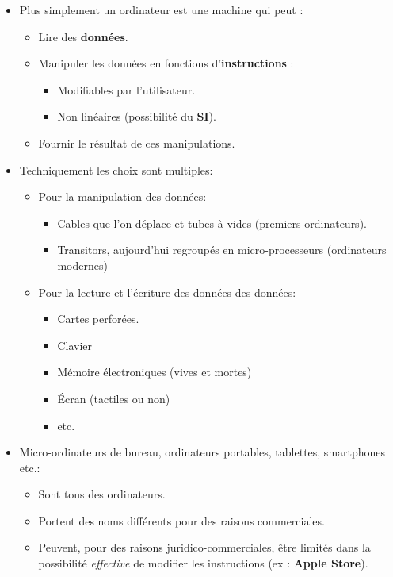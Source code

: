 \begin{slide}
	\begin{itemize}
		\item Plus simplement un ordinateur est une machine qui peut :
			\begin{itemize}
				\item Lire des \textbf{données}. 
				\item Manipuler les données en fonctions d'\textbf{instructions} :
					\begin{itemize}
						\item Modifiables par l'utilisateur.
						\item Non linéaires (possibilité du \textbf{SI}).
					\end{itemize}
				\item Fournir le résultat de ces manipulations. 
			\end{itemize}
		\item Techniquement les choix sont multiples:
			\begin{itemize}
				\item Pour la manipulation des données:
					\begin{itemize}
						\item Cables que l'on déplace et tubes à vides (premiers ordinateurs).
						\item Transitors, aujourd'hui regroupés en micro-processeurs (ordinateurs modernes)
						\
					\end{itemize}
				\item Pour la lecture et l'écriture des données des données:
					\begin{itemize}
						\item Cartes perforées.
						\item Clavier
						\item Mémoire électroniques (vives et mortes)
						\item Écran (tactiles ou non)
						\item etc.
					\end{itemize}
			\end{itemize}
	\end{itemize}
\end{slide}
\begin{slide}
	\begin{itemize}
		\item Micro-ordinateurs de bureau, ordinateurs portables, tablettes, smartphones etc.:
			\begin{itemize}
				\item Sont tous des ordinateurs.
				\item Portent des noms différents pour des raisons commerciales.
				\item Peuvent, pour des raisons juridico-commerciales, être limités dans la possibilité \emph{effective} de modifier les instructions (ex : \textbf{Apple Store}).
			\end{itemize}
	\end{itemize}
\end{slide}